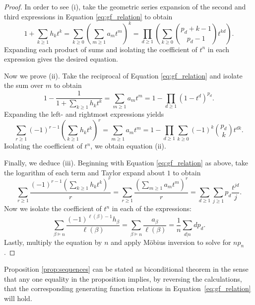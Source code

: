 \documentclass[11pt]{amsart}
\theoremstyle{definition}
\newtheorem{remark}[theorem]{Remark}
\numberwithin{equation}{section}
\begin{document}
\begin{proof}

In order to see (i), take the geometric series expansion of the second and third expressions in Equation \eqref{eq:gf_relation} to obtain
\begin{equation}\label{eq:gf_relation_reciprocal}
1 + \sum_{k \geq 1} h_k t^k
= \sum_{k \geq 0} \left(\sum_{m \geq 1} a_m t^m\right)^k
= \prod_{d \geq 1} \left(\sum_{k \geq 0} \binom{p_d+k-1}{p_d-1} t^{kd}\right).
\end{equation}
Expanding each product of sums and isolating the coefficient of $t^{n}$ in each expression gives the desired equation.

Now we prove (ii).  Take the reciprocal of Equation \eqref{eq:gf_relation}
and isolate the sum over $m$ to obtain
\[
1 - \frac{1}{1 + \sum_{k \geq 1} h_k t^k} 
= \sum_{m \geq 1} a_m t^m 
= 1 - \prod_{d \geq 1} (1-t^d)^{p_d}.
\]
Expanding the left- and rightmost expressions yields
\[
\sum_{r \geq 1} (-1)^{r-1} \left(\sum_{k \geq 1} h_k t^k\right)^r
= \sum_{m \geq 1} a_m t^m
= 1 - \prod_{d \geq 1} \sum_{k \geq 0} (-1)^k \binom{p_d}{k} t^{dk}.
\]
Isolating the coefficient of $t^{n}$, we obtain equation (ii).

Finally, we deduce (iii).  Beginning with Equation \eqref{eq:gf_relation} as above,
take the logarithm of each term and Taylor expand about $1$ to obtain
%
\[
 \sum_{r \geq 1} \frac{(-1)^{r-1}(\sum_{k \geq 1} h_k t^k )^r}{r}
= \sum_{r \geq 1} \frac{(\sum_{m \geq 1} a_m t^m )^r}{r}
= \sum_{d \geq 1} \sum_{j \geq 1} p_d \frac{t^{jd}}{j}.
\]
Now we isolate the coefficient of $t^{n}$ in each of the expressions: 
\[
\sum_{\beta \vDash n} \frac{(-1)^{\ell(\beta)-1} h_\beta}{\ell(\beta)}
= \sum_{\beta \vDash n} \frac{a_\beta}{\ell(\beta)}
= \frac{1}{n} \sum_{d | n} d p_{d} .
\]
Lastly, multiply the equation by $n$ and apply M\"{o}bius inversion to solve for $n p_{n}$.
\end{proof}

Proposition \ref{prop:sequences} can be stated as biconditional theorem in the sense
that any one equality in the proposition implies, by reversing the calculations,
that the corresponding generating function relations in Equation~\eqref{eq:gf_relation}
will hold.
\end{document}
